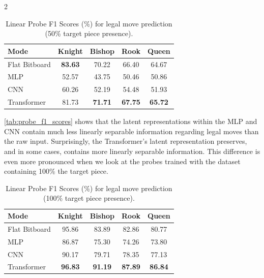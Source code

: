 \documentclass[a4paper,10pt]{article}
\begin{document}
\begin{multicols*}{2}
\begin{table}[H]
\centering
\caption{Linear Probe F1 Scores (\%) for legal move prediction (50\% target piece presence).}
\label{tab:probe_f1_scores}
\setlength{\tabcolsep}{5.8pt} 
\begin{tabular}{@{}lcccc@{}}
\toprule
\textbf{Mode} & \textbf{Knight} & \textbf{Bishop} & \textbf{Rook} & \textbf{Queen} \\ \midrule
Flat Bitboard & \textbf{83.63} & 70.22 & 66.40 & 64.67 \\ \midrule
MLP & 52.57 & 43.75 & 50.46 & 50.86 \\
CNN & 60.26 & 52.19 & 54.48 & 51.93 \\
Transformer & 81.73 & \textbf{71.71} & \textbf{67.75} & \textbf{65.72} \\ \bottomrule
\end{tabular}
\vspace{-1em}
\end{table}

\autoref{tab:probe_f1_scores} shows that the latent representations within the MLP and CNN contain much less linearly separable information regarding legal moves than the raw input. Surprisingly, the Transformer's latent representation preserves, and in some cases, contains more linearly separable information. This difference is even more pronounced when we look at the probes trained with the dataset containing 100\% the target piece.

\begin{table}[H]
\centering
\caption{Linear Probe F1 Scores (\%) for legal move prediction (100\% target piece presence).}
\label{tab:unconstrained_probe_f1_scores}
\setlength{\tabcolsep}{5.8pt} 
\begin{tabular}{@{}lcccc@{}}
\toprule
\textbf{Mode} & \textbf{Knight} & \textbf{Bishop} & \textbf{Rook} & \textbf{Queen} \\ \midrule
Flat Bitboard & 95.86 & 83.89 & 82.86 & 80.77 \\ \midrule
MLP & 86.87 & 75.30 & 74.26 & 73.80 \\
CNN & 90.17 & 79.71 & 78.35 & 77.13 \\
Transformer & \textbf{96.83} & \textbf{91.19} & \textbf{87.89} & \textbf{86.84} \\ \bottomrule
\end{tabular}
\vspace{-1em}
\end{table}


\end{multicols*}
\end{document}
